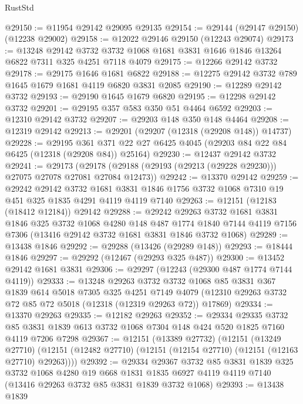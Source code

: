 \begin{lexlean}{RustStd}
\begin{coremodule}
@29150 := @11954 @29142 @29095 @29135
@29154 := @29144 (@29147 @29150) (@12238 @29002)
@29158 := @12022 @29146 @29150 (@12243 @29074)
@29173 := @13248
    @29142
    @3732
    @3732
    @1068
    @1681
    @3831
    @1646
    @1846
    @13264
    @6822
    @7311
    @325
    @4251
    @7118
    @4079
@29175 := @12266 @29142 @3732
@29178 := @29175 @1646 @1681 @6822
@29188 := @12275 @29142 @3732 @789 @1645 @1679 @1681 @4119 @6820 @3831 @2085
@29190 := @12289 @29142 @3732
@29193 := @29190 @1645 @1679 @6820
@29195 := @12298 @29142 @3732
@29201 := @29195 @357 @583 @350 @51 @4464 @6592
@29203 := @12310 @29142 @3732
@29207 := @29203 @148 @350 @148 @4464
@29208 := @12319 @29142
@29213 := @29201 (@29207 (@12318 (@29208 @148)) @14737)
@29228 := @29195
    @361
    @371
    @22
    @27
    @6425
    @4045
    (@29203 @84 @22 @84 @6425 (@12318 (@29208 @84)) @25164)
@29230 := @12437 @29142 @3732
@29241 := @29173
    (@29178 (@29188 (@29193 (@29213 (@29228 @29230))) @27075 @27078 @27081 @27084 @12473))
@29242 := @13370 @29142
@29259 := @29242
    @29142
    @3732
    @1681
    @3831
    @1846
    @1756
    @3732
    @1068
    @7310
    @19
    @451
    @325
    @1835
    @4291
    @4119
    @4119
    @7140
@29263 := @12151 (@12183 (@18412 @12184)) @29142
@29288 := @29242
    @29263
    @3732
    @1681
    @3831
    @1846
    @325
    @3732
    @1068
    @4280
    @148
    @487
    @1774
    @1840
    @7144
    @4119
    @7156
    @7306
    (@13416 @29142 @3732 @1681 @3831 @1846 @3732 @1068)
@29289 := @13438 @1846
@29292 := @29288 (@13426 (@29289 @148))
@29293 := @18444 @1846
@29297 := @29292 (@12467 (@29293 @325 @487))
@29300 := @13452 @29142 @1681 @3831
@29306 := @29297 (@12243 (@29300 @487 @1774 @7144 @4119))
@29333 := @13248
    @29263
    @3732
    @3732
    @1068
    @85
    @3831
    @367
    @1839
    @614
    @5018
    @7305
    @325
    @4251
    @7149
    @4079
    (@12310 @29263 @3732 @72 @85 @72 @5018 (@12318 (@12319 @29263 @72)) @17869)
@29334 := @13370 @29263
@29335 := @12182 @29263
@29352 := @29334
    @29335
    @3732
    @85
    @3831
    @1839
    @613
    @3732
    @1068
    @7304
    @148
    @424
    @520
    @1825
    @7160
    @4119
    @7206
    @7298
@29367 := @12151
    (@13389 @27732)
    (@12151
      (@13249 @27710)
      (@12151 (@12482 @27710) (@12151 (@12154 @27710) (@12151 (@12163 @27710) @29263))))
@29392 := @29334
    @29367
    @3732
    @85
    @3831
    @1839
    @325
    @3732
    @1068
    @4280
    @19
    @668
    @1831
    @1835
    @6927
    @4119
    @4119
    @7140
    (@13416 @29263 @3732 @85 @3831 @1839 @3732 @1068)
@29393 := @13438 @1839

\end{coremodule}
\end{lexlean}
